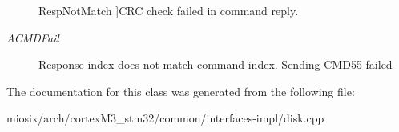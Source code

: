 \begin{Desc}
\begin{description}
{\hypertarget{classmiosix_1_1_cmd_result_a5f41145bee0231a6b1b1db62db692b39a592feae533369038bf78bbbdfefbd6d9}{Resp\-Not\-Match}\label{classmiosix_1_1_cmd_result_a5f41145bee0231a6b1b1db62db692b39a592feae533369038bf78bbbdfefbd6d9}
}]C\-R\-C check failed in command reply. \item[{\em 
\hypertarget{classmiosix_1_1_cmd_result_a5f41145bee0231a6b1b1db62db692b39aeb76d06f07d933210850643b08eb635b}{A\-C\-M\-D\-Fail}\label{classmiosix_1_1_cmd_result_a5f41145bee0231a6b1b1db62db692b39aeb76d06f07d933210850643b08eb635b}
}]Response index does not match command index. Sending C\-M\-D55 failed \end{description}
\end{Desc}


The documentation for this class was generated from the following file\-:\begin{DoxyCompactItemize}
\item 
miosix/arch/cortex\-M3\-\_\-stm32/common/interfaces-\/impl/disk.\-cpp\end{DoxyCompactItemize}
